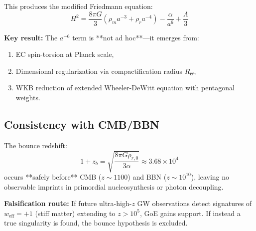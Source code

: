 \documentclass[12pt]{article}
\begin{document}
This produces the modified Friedmann equation:
\begin{equation}
H^2 = \frac{8\pi G}{3}\left(\rho_m a^{-3} + \rho_r a^{-4}\right) - \frac{\alpha}{a^6} + \frac{\Lambda}{3}
\end{equation}

\textbf{Key result:} The $a^{-6}$ term is **not ad hoc**—it emerges from:
\begin{enumerate}
\item EC spin-torsion at Planck scale,
\item Dimensional regularization via compactification radius $R_\Theta$,
\item WKB reduction of extended Wheeler-DeWitt equation with pentagonal weights.
\end{enumerate}

\subsection{Consistency with CMB/BBN}

The bounce redshift:
\begin{equation}
1 + z_b = \sqrt{\frac{8\pi G \rho_{r,0}}{3\alpha}} \approx 3.68 \times 10^4
\end{equation}
occurs **safely before** CMB ($z \sim 1100$) and BBN ($z \sim 10^{10}$), leaving no observable imprints in primordial nucleosynthesis or photon decoupling.

\textbf{Falsification route:} If future ultra-high-$z$ GW observations detect signatures of $w_{\text{eff}} = +1$ (stiff matter) extending to $z > 10^5$, GoE gains support. If instead a true singularity is found, the bounce hypothesis is excluded.



\end{document}
